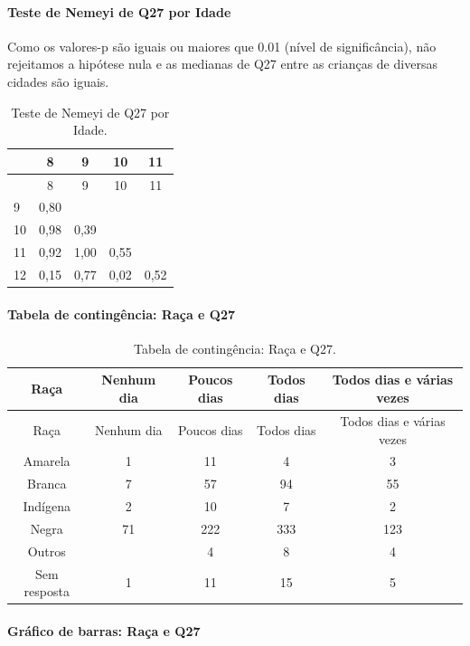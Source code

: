 \documentclass[]{article}
\let\oldparagraph\paragraph
\renewcommand{\paragraph}[1]{\oldparagraph{#1}\mbox{}}
\begin{document}
\hypertarget{teste-de-nemeyi-de-q27-por-idade}{%
\paragraph{Teste de Nemeyi de Q27 por Idade}\label{teste-de-nemeyi-de-q27-por-idade}}

Como os valores-p são iguais ou maiores que 0.01 (nível de significância), não rejeitamos a hipótese nula e as medianas de Q27 entre as crianças de diversas cidades são iguais.

\begin{longtable}[]{@{}lcccc@{}}
\caption{\label{tab:unnamed-chunk-808}Teste de Nemeyi de Q27 por Idade.}\tabularnewline
\toprule
& 8 & 9 & 10 & 11\tabularnewline
\midrule
\endfirsthead
\toprule
& 8 & 9 & 10 & 11\tabularnewline
\midrule
\endhead
9 & 0,80 & & &\tabularnewline
10 & 0,98 & 0,39 & &\tabularnewline
11 & 0,92 & 1,00 & 0,55 &\tabularnewline
12 & 0,15 & 0,77 & 0,02 & 0,52\tabularnewline
\bottomrule
\end{longtable}

\cleardoublepage

\hypertarget{tabela-de-continguxeancia-rauxe7a-e-q27}{%
\paragraph{Tabela de contingência: Raça e Q27}\label{tabela-de-continguxeancia-rauxe7a-e-q27}}

\begin{longtable}[]{@{}ccccc@{}}
\caption{\label{tab:unnamed-chunk-809}Tabela de contingência: Raça e Q27.}\tabularnewline
\toprule
Raça & Nenhum dia & Poucos dias & Todos dias & Todos dias e várias vezes\tabularnewline
\midrule
\endfirsthead
\toprule
Raça & Nenhum dia & Poucos dias & Todos dias & Todos dias e várias vezes\tabularnewline
\midrule
\endhead
Amarela & 1 & 11 & 4 & 3\tabularnewline
Branca & 7 & 57 & 94 & 55\tabularnewline
Indígena & 2 & 10 & 7 & 2\tabularnewline
Negra & 71 & 222 & 333 & 123\tabularnewline
Outros & & 4 & 8 & 4\tabularnewline
Sem resposta & 1 & 11 & 15 & 5\tabularnewline
\bottomrule
\end{longtable}

\hypertarget{gruxe1fico-de-barras-rauxe7a-e-q27}{%
\paragraph{Gráfico de barras: Raça e Q27}\label{gruxe1fico-de-barras-rauxe7a-e-q27}}
\end{document}
